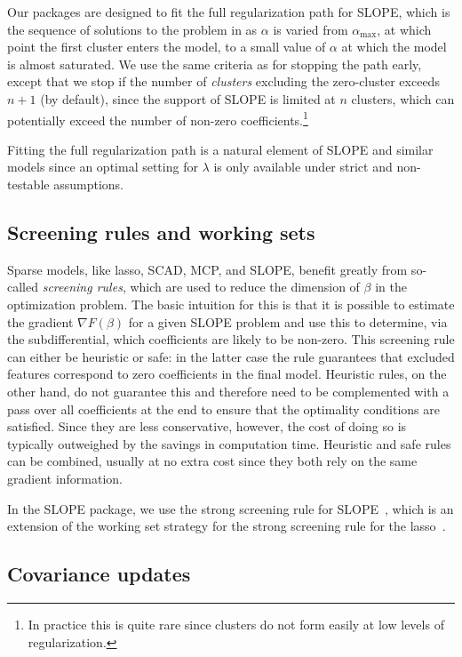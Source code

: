 \documentclass[article]{jss}
\let\Cref\crtCref
\begin{document}
Our packages are designed to fit the full regularization path for SLOPE, which
is the sequence of solutions to the problem in \Cref{eq:slope} as \(\alpha\) is varied
from \(\alpha_\text{max}\), at which point the first cluster enters the model,
to a small value of \(\alpha\) at which the model is almost saturated.
We use the same criteria as \citet{friedman2010} for stopping the path early,
except that we stop if the number of \emph{clusters} excluding the zero-cluster
exceeds \(n + 1\) (by default), since the support of SLOPE is limited at \(n\) clusters,
which can potentially exceed the number of non-zero coefficients.\footnote{In practice
  this is quite rare since clusters do not form easily at low levels of regularization.}

Fitting the full regularization path is a natural element of SLOPE and similar
models since an optimal setting for \(\lambda\) is only available under
strict and non-testable assumptions.

\subsection{Screening rules and working sets}

Sparse models, like lasso, SCAD, MCP, and SLOPE, benefit greatly from
so-called \emph{screening rules}, which are used to reduce the dimension of
\(\beta\) in the optimization problem. The basic intuition for this is that
it is possible to estimate the gradient \(\nabla F(\beta) \) for a given SLOPE problem
and use this to determine, via the subdifferential, which coefficients are
likely to be non-zero. This screening rule can either be heuristic or safe:
in the latter case the rule guarantees that excluded features correspond
to zero coefficients in the final model. Heuristic rules, on the other hand,
do not guarantee this and therefore need to be complemented with a pass
over all coefficients at the end to ensure that the optimality conditions
are satisfied. Since they are less conservative, however, the cost of
doing so is typically outweighed by the savings in computation time.
Heuristic and safe rules can be combined, usually at no extra cost since
they both rely on the same gradient information.

In the SLOPE package, we use the strong screening rule for
SLOPE~\citep{larsson2020a}, which is an extension of the working set strategy
for the strong screening rule for the lasso~\citep{tibshirani2012}.

\subsection{Covariance updates}
\end{document}
